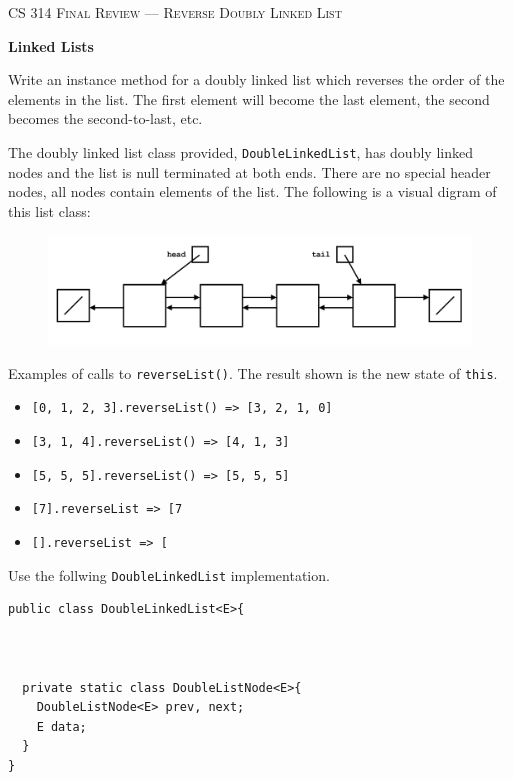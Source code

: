 \documentclass[12pt]{article}
\begin{document}
\noindent\textsc{\large CS 314 Final Review --- Reverse Doubly Linked List}

\vspace{6pt}
\noindent\textbf{Linked Lists}

\vspace{2pt}
\noindent  Write an instance method for a doubly linked list which reverses the order of the elements in the list. The first element will 
become the last element, the second becomes the second-to-last, etc. 

\vspace{2pt}
\noindent The doubly linked list class provided, \texttt{DoubleLinkedList}, has doubly linked nodes and the list is null terminated at both ends.
There are no special header nodes, all nodes contain elements of the list. The following is a visual digram of this list class:

\begin{figure}[h!]
  \hfill
  \includegraphics[width=115mm, scale=0.5]{diagram.png}
  \hspace*{\fill}
\end{figure}

\noindent Examples of calls to \texttt{reverseList()}. The result shown is the new state of \texttt{this}.
\begin{itemize}
  \item \texttt{[0, 1, 2, 3].reverseList() => [3, 2, 1, 0]}
  \item \texttt{[3, 1, 4].reverseList() => [4, 1, 3]}
  \item \texttt{[5, 5, 5].reverseList() => [5, 5, 5]}
  \item \texttt{[7].reverseList => [7}
  \item \texttt{[].reverseList => [}
\end{itemize}

\vspace{6pt}
\noindent Use the follwing \texttt{DoubleLinkedList} implementation.
\begin{verbatim}
public class DoubleLinkedList<E>{

   

  private static class DoubleListNode<E>{
    DoubleListNode<E> prev, next;
    E data;
  }
}
\end{verbatim}
\end{document}
